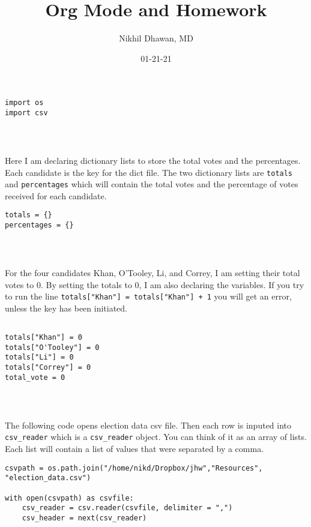 \documentclass[11pt]{article}
\author{Nikhil Dhawan, MD}
\date{01-21-21}
\title{Org Mode and Homework}
\begin{document}
\maketitle
\tableofcontents

\begin{verbatim}
import os
import csv
\end{verbatim}

\begin{verbatim}



\end{verbatim}


Here I am declaring dictionary lists to store the total votes and the percentages. Each candidate is the key for the dict file. The two dictionary lists are \texttt{totals} and \texttt{percentages} which will contain the total votes and the percentage of votes received for each candidate. 

\begin{verbatim}
totals = {}
percentages = {}
\end{verbatim}

\begin{verbatim}



\end{verbatim}


For the four candidates Khan, O'Tooley, Li, and Correy, I am setting their total votes to 0. By setting the totals to 0, I am also declaring the variables. If you try to run the line \texttt{\texttt{totals["Khan"] = totals["Khan"] + 1}} you will get an error, unless the key has been initiated. 

\begin{verbatim}

totals["Khan"] = 0
totals["O'Tooley"] = 0
totals["Li"] = 0
totals["Correy"] = 0
total_vote = 0

\end{verbatim}

\begin{verbatim}



\end{verbatim}


The following code opens election data csv file. Then each row is inputed into \texttt{csv\_reader} which is a \texttt{csv\_reader} object. You can think of it as an array of lists. Each list will contain a list of values that were separated by a comma. 

\begin{verbatim}
csvpath = os.path.join("/home/nikd/Dropbox/jhw","Resources", "election_data.csv")  

with open(csvpath) as csvfile:
    csv_reader = csv.reader(csvfile, delimiter = ",")
    csv_header = next(csv_reader)
\end{verbatim}
\end{document}
